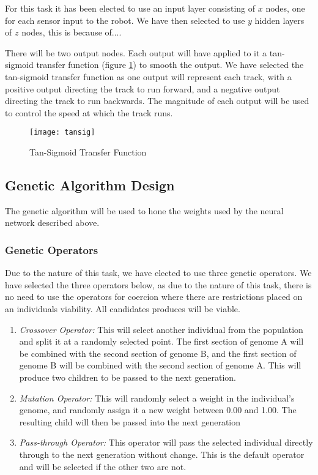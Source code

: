 For this task it has been elected to use an input layer consisting of $x$ nodes, one for each sensor input to the robot. We have then selected to use $y$ hidden layers of $z$ nodes, this is because of....

There will be two output nodes. Each output will have applied to it a tan-sigmoid transfer function (figure \ref{fig:tansig}) to smooth the output. We have selected the tan-sigmoid transfer function as one output will represent each track, with a positive output directing the track to run forward, and a negative output directing the track to run backwards. The magnitude of each output will be used to control the speed at which the track runs.

\begin{figure}[h]
	\begin{center}
		\texttt{[image: tansig]}
		\caption{Tan-Sigmoid Transfer Function}
		\label{fig:tansig}
	\end{center}
\end{figure}

\subsection{Genetic Algorithm Design}
\label{sec:GADesign}
The genetic algorithm will be used to hone the weights used by the neural network described above. 
\subsubsection{Genetic Operators}
Due to the nature of this task, we have elected to use three genetic operators. We have selected the three operators below, as due to the nature of this task, there is no need to use the operators for coercion where there are restrictions placed on an individuals viability. All candidates produces will be viable.
\begin{enumerate}
	\item \textit{Crossover Operator:} This will select another individual from the population and split it at a randomly selected point. The first section of genome A will be combined with the second section of genome B, and the first section of genome B will be combined with the second section of genome A. This will produce two children to be passed to the next generation.
	\item \textit{Mutation Operator:} This will randomly select a weight in the individual's genome, and randomly assign it a new weight between 0.00 and 1.00. The resulting child will then be passed into the next generation
	\item \textit{Pass-through Operator:} This operator will pass the selected individual directly through to the next generation without change. This is the default operator and will be selected if the other two are not.
\end{enumerate}

